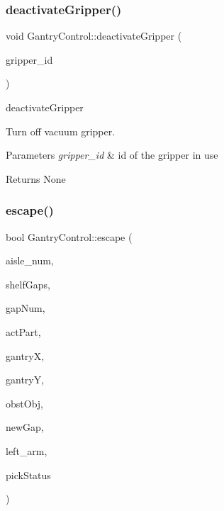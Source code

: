 \subsubsection{\texorpdfstring{deactivate\+Gripper()}{deactivateGripper()}}
{\footnotesize\ttfamily void Gantry\+Control\+::deactivate\+Gripper (\begin{DoxyParamCaption}\item[{std\+::string}]{gripper\+\_\+id }\end{DoxyParamCaption})}



deactivate\+Gripper 

Turn off vacuum gripper.


\begin{DoxyParams}{Parameters}
{\em gripper\+\_\+id} & id of the gripper in use \\
\hline
\end{DoxyParams}
\begin{DoxyReturn}{Returns}
None 
\end{DoxyReturn}
\mbox{\label{classGantryControl_aa014dd433af4fc580d38639c6353e7b8}} 
\subsubsection{\texorpdfstring{escape()}{escape()}}
{\footnotesize\ttfamily bool Gantry\+Control\+::escape (\begin{DoxyParamCaption}\item[{int \&}]{aisle\+\_\+num,  }\item[{std\+::vector$<$ std\+::pair$<$ float, float $>$ $>$ \&}]{shelf\+Gaps,  }\item[{const std\+::vector$<$ int $>$ \&}]{gap\+Num,  }\item[{bool}]{act\+Part,  }\item[{float \&}]{gantryX,  }\item[{float \&}]{gantryY,  }\item[{\hyperlink{classObstaclesInAisle}{Obstacles\+In\+Aisle} \&}]{obst\+Obj,  }\item[{int \&}]{new\+Gap,  }\item[{std\+::vector$<$ double $>$ \&}]{left\+\_\+arm,  }\item[{bool}]{pick\+Status }\end{DoxyParamCaption})}



